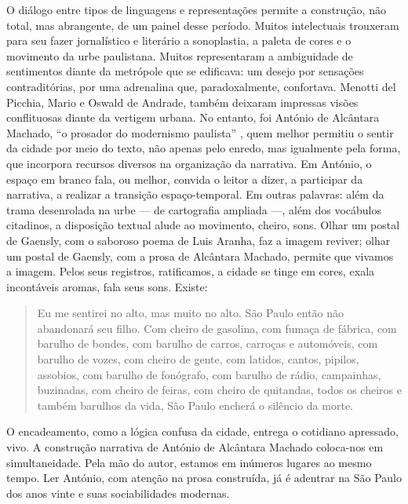 \begin{refsection}
    O diálogo entre tipos de linguagens e representações permite a construção, não total, mas abrangente, de um painel desse período. Muitos intelectuais trouxeram para seu fazer jornalístico e literário a sonoplastia, a paleta de cores e o movimento da urbe paulistana. Muitos representaram a ambiguidade de sentimentos diante da metrópole que se edificava: um desejo por sensações contraditórias, por uma adrenalina que, paradoxalmente, confortava.  Menotti del Picchia, Mario e Oswald de Andrade, também deixaram impressas visões conflituosas diante da vertigem urbana. No entanto, foi António de Alcântara Machado, ``o prosador do modernismo paulista'' \cite[p.~400]{Bosi2006Historia}, quem melhor permitiu o sentir da cidade por meio do texto, não apenas pelo enredo, mas igualmente pela forma, que incorpora recursos diversos na organização da narrativa. Em António, o espaço em branco fala, ou melhor, convida o leitor a dizer, a participar da narrativa, a realizar a transição espaço-temporal. Em outras palavras: além da trama desenrolada na urbe --- de cartografia ampliada ---, além dos vocábulos citadinos, a disposição textual alude ao movimento, cheiro, sons. Olhar um postal de Gaensly, com o saboroso poema de Luis Aranha, faz a imagem reviver; olhar um postal de Gaensly, com a prosa de Alcântara Machado, permite que vivamos a imagem. Pelos seus registros, ratificamos, a cidade se tinge em cores, exala incontáveis aromas, fala seus sons. Existe:

    \begin{quotation}
        Eu me sentirei no alto, mas muito no alto. São Paulo então não abandonará seu filho. Com cheiro de gasolina, com fumaça de fábrica, com barulho de bondes, com barulho de carros, carroças e automóveis, com barulho de vozes, com cheiro de gente, com latidos, cantos, pipilos, assobios, com barulho de fonógrafo, com barulho de rádio, campainhas, buzinadas, com cheiro de feiras, com cheiro de quitandas, todos os cheiros e também barulhos da vida, São Paulo encherá o silêncio da morte. \cite[p.~148]{Machado1970Meditatio} 
    \end{quotation}

    O encadeamento, como a lógica confusa da cidade, entrega o cotidiano apressado, vivo. A construção narrativa de António de Alcântara Machado coloca-nos em simultaneidade. Pela mão do autor, estamos em inúmeros lugares ao mesmo tempo. Ler António, com atenção na prosa construída, já é adentrar na São Paulo dos anos vinte e suas sociabilidades modernas.  


\end{refsection}
